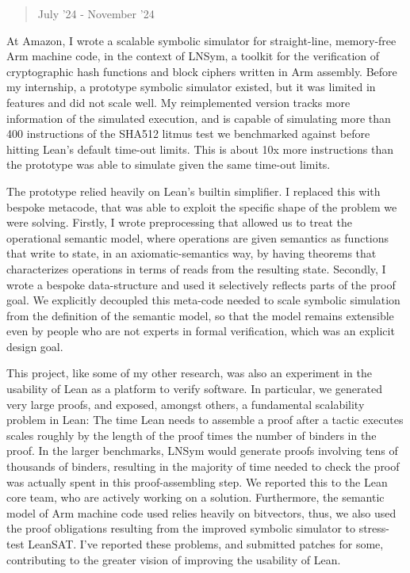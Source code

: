 \documentclass[a4paper]{scrartcl}
\begin{document}
\begin{quote}
July '24 - November '24
\end{quote}

At Amazon, I wrote a scalable symbolic simulator for straight-line, memory-free Arm machine code, in the context of LNSym, 
a toolkit for the verification of cryptographic hash functions and block ciphers written in Arm assembly.
Before my internship, a prototype symbolic simulator existed, but it was limited in features and did not scale well.
My reimplemented version tracks more information of the simulated execution, 
and is capable of simulating more than 400 instructions of the SHA512 litmus test we benchmarked against before hitting Lean's default time-out limits.
This is about 10x more instructions than the prototype was able to simulate given the same time-out limits.

The prototype relied heavily on Lean's builtin simplifier. 
I replaced this with bespoke metacode, that was able to exploit the specific shape of the problem we were solving.
Firstly, I wrote preprocessing that allowed us to treat the operational semantic model, where operations are given semantics as functions that write to state, 
in an axiomatic-semantics way, by having theorems that characterizes operations in terms of reads from the resulting state.
Secondly, I wrote a bespoke data-structure and used it selectively reflects parts of the proof goal.
We explicitly decoupled this meta-code needed to scale symbolic simulation from the definition of the semantic model,
so that the model remains extensible even by people who are not experts in formal verification, which was an explicit design goal.

This project, like some of my other research, was also an experiment in the usability of Lean as a platform to verify software.
In particular, we generated very large proofs, and exposed, amongst others, a fundamental scalability problem in Lean:
The time Lean needs to assemble a proof after a tactic executes scales roughly by the length of the proof times the number of binders in the proof.
In the larger benchmarks, LNSym would generate proofs involving tens of thousands of binders,
resulting in the majority of time needed to check the proof was actually spent in this proof-assembling step.
We reported this to the Lean core team, who are actively working on a solution.
Furthermore, the semantic model of Arm machine code used relies heavily on bitvectors, thus, we also used the proof obligations resulting from the improved symbolic simulator to stress-test LeanSAT. I've reported these problems, and submitted patches for some, contributing to the greater vision of improving the usability of Lean.
\end{document}
